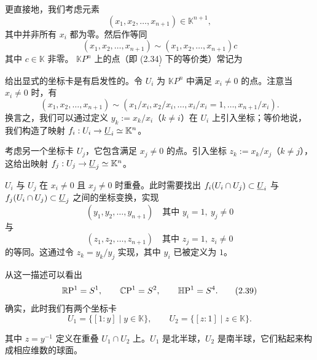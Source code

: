 更直接地，我们考虑元素
\begin{equation}
(x_1,x_2,\ldots,x_{n+1})\in\mathbb{K}^{n+1}, \tag{2.33}
\end{equation}
其中并非所有 $x_i$ 都为零。然后作等同
\begin{equation}
(x_1,x_2,\ldots,x_{n+1})\sim(x_1,x_2,\ldots,x_{n+1})c \tag{2.34}
\end{equation}
其中 $c\in\mathbb{K}$ 非零。%
$\mathbb{K}P^n$ 上的点（即 (2.34) 下的等价类）常记为
\begin{equation}
[x_1:x_2:\cdots:x_{n+1}]. \tag{2.35}
\end{equation}

给出显式的坐标卡是有启发性的。令 $U_i$ 为 $\mathbb{K}P^n$ 中满足 $x_i\neq0$ 的点。注意当 $x_i\neq0$ 时，有
\begin{equation}
(x_1,x_2,\ldots,x_{n+1})\sim(x_1/x_i,x_2/x_i,\ldots,x_i/x_i=1,\ldots,x_{n+1}/x_i). \tag{2.36}
\end{equation}
换言之，我们可以通过定义 $y_k:=x_k/x_i$（$k\neq i$）在 $U_i$ 上引入坐标；等价地说，我们构造了映射 $f_i:U_i\to\underline{U}_i\simeq\mathbb{K}^n$。

考虑另一个坐标卡 $U_j$，它包含满足 $x_j\neq0$ 的点。引入坐标 $z_k:=x_k/x_j$（$k\neq j$），这给出映射 $f_j:U_j\to\underline{U}_j\simeq\mathbb{K}^n$。

$U_i$ 与 $U_j$ 在 $x_i\neq0$ 且 $x_j\neq0$ 时重叠。此时需要找出 $f_i(U_i\cap U_j)\subset\underline{U}_i$ 与 $f_j(U_i\cap U_j)\subset\underline{U}_j$ 之间的坐标变换，实现
\begin{equation}
(y_1,y_2,\ldots,y_{n+1})\quad\text{其中 } y_i=1,\ y_j\neq0 \tag{2.37}
\end{equation}
与
\begin{equation}
(z_1,z_2,\ldots,z_{n+1})\quad\text{其中 } z_j=1,\ z_i\neq0 \tag{2.38}
\end{equation}
的等同。这通过令 $z_k=y_k/y_j$ 实现，其中 $y_i$ 已被定义为 $1$。

从这一描述可以看出
\begin{equation}
\mathbb{R}\mathrm{P}^1=S^1,\qquad \mathbb{C}\mathrm{P}^1=S^2,\qquad \mathbb{H}\mathrm{P}^1=S^4. \tag{2.39}
\end{equation}
确实，此时我们有两个坐标卡
\begin{equation}
U_1=\{[1:y]\mid y\in\mathbb{K}\},\qquad U_2=\{[z:1]\mid z\in\mathbb{K}\}. \tag{2.40}
\end{equation}

其中 $z=y^{-1}$ 定义在重叠 $U_1\cap U_2$ 上。$U_1$ 是北半球，$U_2$ 是南半球，它们粘起来构成相应维数的球面。

